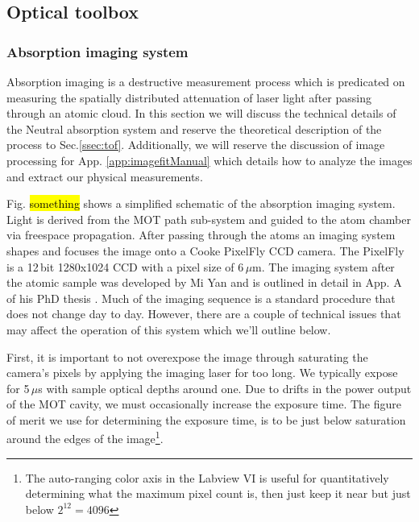 \subsection{Optical toolbox} \label{ssec:op_tools}
\subsubsection{Absorption imaging system}
Absorption imaging is a destructive measurement process which is predicated on measuring the spatially distributed attenuation of laser light after passing through an atomic cloud. 
In this section we will discuss the technical details of the Neutral absorption system and reserve the theoretical description of the process to Sec.\ref{ssec:tof}.
Additionally, we will reserve the discussion of image processing for App. \ref{app:imagefitManual} which details how to analyze the images and extract our physical measurements.

Fig. \hl{something} shows a simplified schematic of the absorption imaging system.
Light is derived from the MOT path sub-system and guided to the atom chamber via freespace propagation. 
After passing through the atoms an imaging system shapes and focuses the image onto a Cooke PixelFly CCD camera.
The PixelFly is a 12\,bit 1280x1024 CCD with a pixel size of 6\,$\mu$m.
The imaging system after the atomic sample was developed by Mi Yan and is outlined in detail in App. A of his PhD thesis \cite{Yan2013d}. 
Much of the imaging sequence is a standard procedure that does not change day to day.
However, there are a couple of technical issues that may affect the operation of this system which we'll outline below.

First, it is important to not overexpose the image through saturating the camera's pixels by applying the imaging laser for too long.
We typically expose for 5\,$\mu$s with sample optical depths around one.
Due to drifts in the power output of the MOT cavity, we must occasionally increase the exposure time.
The figure of merit we use for determining the exposure time, is to be just below saturation around the edges of the image\footnote{The auto-ranging color axis in the Labview VI is useful for quantitatively determining what the maximum pixel count is, then just keep it near but just below $2^{12}=4096$}.

